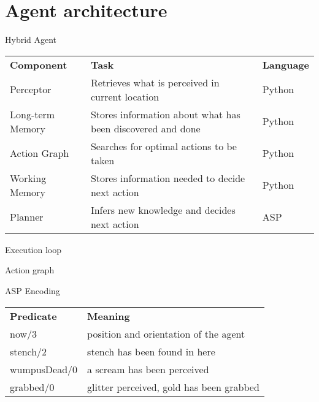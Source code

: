 \documentclass[smaller,dvipsnames,ratio=169]{beamer}
\begin{document}
  \section{Agent architecture}

  \begin{frame}{Hybrid Agent}
      \begin{tabular}{lll}
        \textbf{Component} & \textbf{Task} & \textbf{Language} \\
        Perceptor & Retrieves what is perceived in current location & Python \\
        Long-term Memory & Stores information about what has been discovered and done & Python \\
        Action Graph & Searches for optimal actions to be taken & Python \\
        Working Memory & Stores information needed to decide next action & Python \\
        Planner & Infers new knowledge and decides next action & ASP \\ 
      \end{tabular}
  \end{frame}

  \begin{frame}{Execution loop}
  \end{frame}

  \begin{frame}{Action graph}
    
  \end{frame}

  \begin{frame}{ASP Encoding}
    \begin{center}
      \begin{tabular}{ll}
        \textbf{Predicate} & \textbf{Meaning} \\
        now/3 & position and orientation of the agent \\
        stench/2 & stench has been found in here \\
        wumpusDead/0 & a scream has been perceived \\
        grabbed/0 & glitter perceived, gold has been grabbed \\
      \end{tabular}
    \end{center}
  \end{frame}
\end{document}
